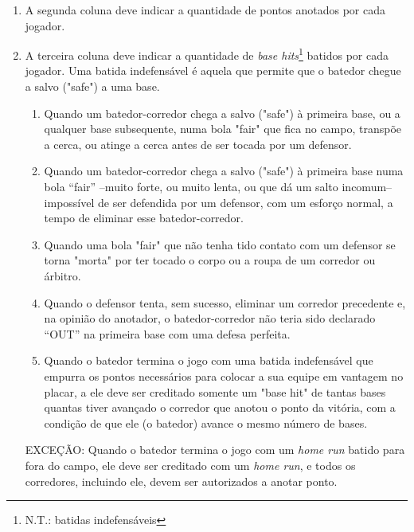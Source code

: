 \begin{multicols}{2}
\begin{enumerate}[label= \arabic*)]
		\item A segunda coluna deve indicar a quantidade de pontos anotados por cada jogador. 
		\item A terceira coluna deve indicar a quantidade de \textit{base hits}\footnote{N.T.: batidas indefensáveis}
		batidos por cada jogador. Uma batida indefensável é aquela que permite que o 
		batedor chegue a salvo ("safe") a uma base. 
		\begin{enumerate}[label= (\alph*)]
			\item Quando um batedor-corredor chega a salvo ("safe") à primeira base, ou a qualquer base subsequente, numa bola "fair" que fica no campo, transpõe a cerca, ou atinge a cerca antes de ser tocada por um defensor. 
			\item Quando um batedor-corredor chega a salvo ("safe") à primeira base numa bola “fair” –muito forte, ou muito lenta, ou que dá um salto incomum– impossível de ser defendida por um defensor, com um esforço normal, a tempo de eliminar esse batedor-corredor. 
			\item Quando uma bola "fair" que não tenha tido contato com um defensor se torna "morta" por ter tocado o corpo ou a roupa de um corredor ou árbitro. 
			\item Quando o defensor tenta, sem sucesso, eliminar um corredor precedente e, na opinião do anotador, o batedor-corredor não teria sido declarado “OUT” na primeira base com uma defesa perfeita. 
			\item  Quando o batedor termina o jogo com uma batida indefensável que empurra os pontos necessários para colocar a sua equipe em vantagem no placar, a ele deve ser creditado somente um "base hit" de tantas bases quantas tiver avançado o corredor que anotou o ponto da vitória, com a condição de que ele (o batedor) avance o mesmo número de bases. 
		\end{enumerate}
		
		EXCEÇÃO: Quando o batedor termina o jogo com um \textit{home run} batido para fora do campo, ele deve ser creditado com um \textit{home run}, e todos os corredores, incluindo ele, devem ser autorizados a anotar ponto. 
		

\end{enumerate}
\end{multicols}
